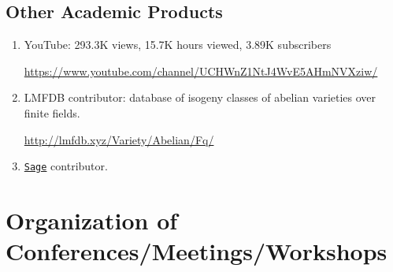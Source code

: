 \documentclass[a4paper,10pt]{article}
\begin{document}
\subsection*{Other Academic Products}
\begin{enumerate}
	\item YouTube: 293.3K views, 15.7K hours viewed, 3.89K subscribers
	\begin{center}
		 \url{https://www.youtube.com/channel/UCHWnZ1NtJ4WvE5AHmNVXziw/}
	\end{center}
	\item LMFDB contributor: database of isogeny classes of abelian varieties over finite fields.
	 \begin{center}
	 	\url{http://lmfdb.xyz/Variety/Abelian/Fq/}
	 \end{center}
	\item \href{https://www.sagemath.org/}{\texttt{Sage}} contributor. 
			\

\end{enumerate}

\section*{Organization of Conferences/Meetings/Workshops}
\end{document}
